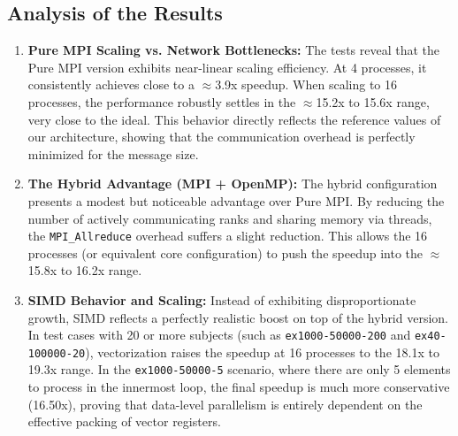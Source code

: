 \documentclass[12pt,a4paper]{article}
\begin{document}
\subsection{Analysis of the Results}

\begin{enumerate}
    \item \textbf{Pure MPI Scaling vs. Network Bottlenecks:}
    The tests reveal that the Pure MPI version exhibits near-linear scaling efficiency. At 4 processes, it consistently achieves close to a $\approx$3.9x speedup. When scaling to 16 processes, the performance robustly settles in the $\approx$15.2x to 15.6x range, very close to the ideal. This behavior directly reflects the reference values of our architecture, showing that the communication overhead is perfectly minimized for the message size.

    \item \textbf{The Hybrid Advantage (MPI + OpenMP):}
    The hybrid configuration presents a modest but noticeable advantage over Pure MPI. By reducing the number of actively communicating ranks and sharing memory via threads, the \texttt{MPI\_Allreduce} overhead suffers a slight reduction. This allows the 16 processes (or equivalent core configuration) to push the speedup into the $\approx$15.8x to 16.2x range.

    \item \textbf{SIMD Behavior and Scaling:}
    Instead of exhibiting disproportionate growth, SIMD reflects a perfectly realistic boost on top of the hybrid version. In test cases with 20 or more subjects (such as \texttt{ex1000-50000-200} and \texttt{ex40-100000-20}), vectorization raises the speedup at 16 processes to the 18.1x to 19.3x range. In the \texttt{ex1000-50000-5} scenario, where there are only 5 elements to process in the innermost loop, the final speedup is much more conservative (16.50x), proving that data-level parallelism is entirely dependent on the effective packing of vector registers.
\end{enumerate}
\end{document}
